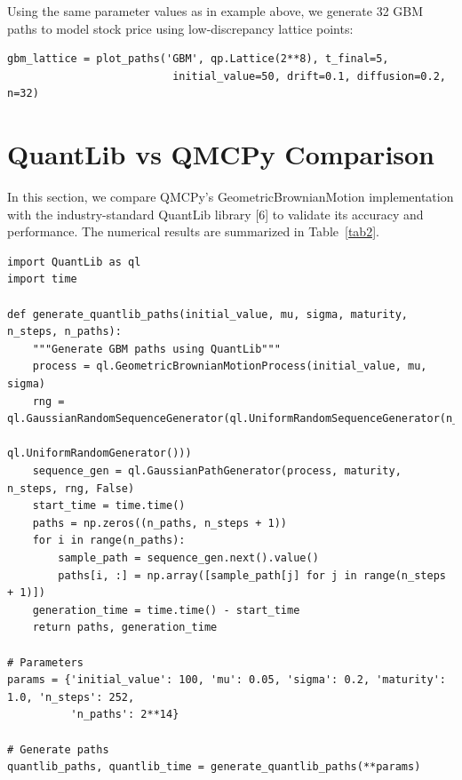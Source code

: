 \documentclass{article}
\begin{document}
Using the same parameter values as in example above, we generate 32 GBM paths to model stock price using low-discrepancy lattice points:

\begin{verbatim}
gbm_lattice = plot_paths('GBM', qp.Lattice(2**8), t_final=5, 
                          initial_value=50, drift=0.1, diffusion=0.2, n=32)
\end{verbatim}



\section{QuantLib vs QMCPy Comparison}

In this section, we compare QMCPy's GeometricBrownianMotion implementation with the industry-standard QuantLib library [6] to validate its accuracy and performance. The numerical results are summarized in Table~\ref{tab2}.


\begin{verbatim}
import QuantLib as ql
import time

def generate_quantlib_paths(initial_value, mu, sigma, maturity, n_steps, n_paths):
    """Generate GBM paths using QuantLib"""
    process = ql.GeometricBrownianMotionProcess(initial_value, mu, sigma)
    rng = ql.GaussianRandomSequenceGenerator(ql.UniformRandomSequenceGenerator(n_steps, 
                                             ql.UniformRandomGenerator()))
    sequence_gen = ql.GaussianPathGenerator(process, maturity, n_steps, rng, False)
    start_time = time.time()
    paths = np.zeros((n_paths, n_steps + 1))
    for i in range(n_paths):
        sample_path = sequence_gen.next().value()
        paths[i, :] = np.array([sample_path[j] for j in range(n_steps + 1)])
    generation_time = time.time() - start_time
    return paths, generation_time

# Parameters
params = {'initial_value': 100, 'mu': 0.05, 'sigma': 0.2, 'maturity': 1.0, 'n_steps': 252, 
          'n_paths': 2**14}

# Generate paths 
quantlib_paths, quantlib_time = generate_quantlib_paths(**params)
\end{verbatim}
\end{document}
